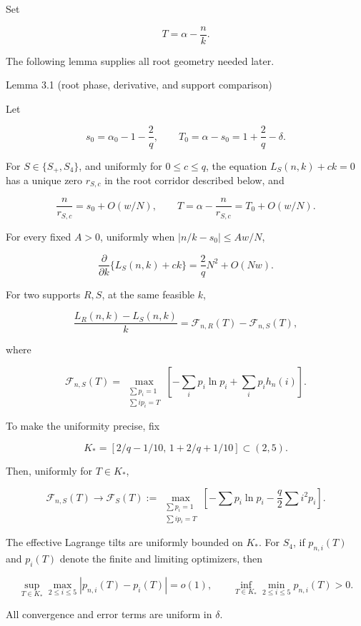\documentclass[
  11pt,
  a4paper,
]{article}
\begin{document}
Set

\[
 T=\alpha-\frac nk.                                      \tag{3.4}
\]

The following lemma supplies all root geometry needed later.

{}
\label{lemma-3.1-root-phase-derivative-and-support-comparison}
\begin{lemmabox}{Lemma 3.1 (root phase, derivative, and support comparison)}

Let

\[
 s_0=\alpha_0-1-\frac2q,\qquad
 T_0=\alpha-s_0=1+\frac2q-\delta.                        \tag{3.5}
\]

For \(S\in\{S_+,S_4\}\), and uniformly for \(0\le c\le q\), the equation
\(L_S(n,k)+ck=0\) has a unique zero \(r_{S,c}\) in the root corridor
described below, and

\[
 \frac n{r_{S,c}}=s_0+O(w/N),\qquad
 T=\alpha-\frac n{r_{S,c}}=T_0+O(w/N).                  \tag{3.6}
\]

For every fixed \(A>0\), uniformly when \(|n/k-s_0|\le Aw/N\),

\[
 \frac{\partial}{\partial k}\{L_S(n,k)+ck\}
 =\frac2qN^2+O(Nw).                                      \tag{3.7}
\]

For two supports \(R,S\), at the same feasible \(k\),

\[
 \frac{L_R(n,k)-L_S(n,k)}k
 =\mathcal F_{n,R}(T)-\mathcal F_{n,S}(T),               \tag{3.8}
\]

where

\[
 \mathcal F_{n,S}(T)=
 \max_{\substack{\sum p_i=1\\\sum ip_i=T}}
 \left[-\sum_i p_i\ln p_i+\sum_i p_i h_n(i)\right].     \tag{3.8a}
\]

To make the uniformity precise, fix

\[
 K_*=[2/q-1/10,\,1+2/q+1/10]\subset(2,5).               \tag{3.9a}
\]

Then, uniformly for \(T\in K_*\),

\[
 \mathcal F_{n,S}(T)\longrightarrow
 \mathcal F_S(T):=\max_{\substack{\sum p_i=1\\\sum ip_i=T}}
 \left[-\sum p_i\ln p_i-\frac q2\sum i^2p_i\right].  \tag{3.9}
\]

The effective Lagrange tilts are uniformly bounded on \(K_*\). For
\(S_4\), if \(p_{n,i}(T)\) and \(p_i(T)\) denote the finite and limiting
optimizers, then

\[
 \sup_{T\in K_*}\max_{2\le i\le5}|p_{n,i}(T)-p_i(T)|=o(1),
 \qquad
 \inf_{T\in K_*}\min_{2\le i\le5}p_{n,i}(T)>0.          \tag{3.9b}
\]

All convergence and error terms are uniform in \(\delta\).

\end{lemmabox}
\end{document}
